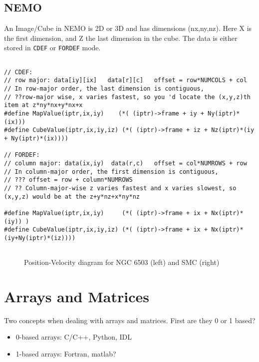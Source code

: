 \documentclass[preprint]{aastex} %
\begin{document}
\subsection{NEMO}

An Image/Cube in NEMO is 2D or 3D and has dimensions (nx,ny,nz). Here 
X is the first dimension, and Z the last dimension in the cube.
The data is either stored in {\tt CDEF} or {\tt FORDEF} mode.



\footnotesize
\begin{verbatim}

// CDEF:
// row major: data[iy][ix]   data[r][c]   offset = row*NUMCOLS + col 
// In row-major order, the last dimension is contiguous,
// ??row-major wise, x varies fastest, so you 'd locate the (x,y,z)th item at z*ny*nx+y*nx+x
#define MapValue(iptr,ix,iy)	(*( (iptr)->frame + iy + Ny(iptr)*(ix)))
#define CubeValue(iptr,ix,iy,iz) (*( (iptr)->frame + iz + Nz(iptr)*(iy + Ny(iptr)*(ix))))

// FORDEF:
// column major: data(ix,iy)  data(r,c)   offset = col*NUMROWS + row
// In column-major order, the first dimension is contiguous,
// ??? offset = row + column*NUMROWS 
// ?? Column-major-wise z varies fastest and x varies slowest, so (x,y,z) would be at the z+y*nz+x*ny*nz 

#define MapValue(iptr,ix,iy)	 (*( (iptr)->frame + ix + Nx(iptr)*(iy)) )
#define CubeValue(iptr,ix,iy,iz) (*( (iptr)->frame + ix + Nx(iptr)*(iy+Ny(iptr)*(iz))))


\end{verbatim}
\normalsize



\begin{figure}
\caption{Position-Velocity diagram for NGC 6503 (left) and SMC (right)}
\label{fig:pv1}
\end{figure}


\section{Arrays and Matrices}

Two concepts when dealing with arrays and matrices. First are they 0 or 1 based?

\begin{itemize}
\item
0-based arrays:   C/C++,  Python, IDL
\item
1-based arrays:   Fortran, matlab?
\end{itemize}
\end{document}
